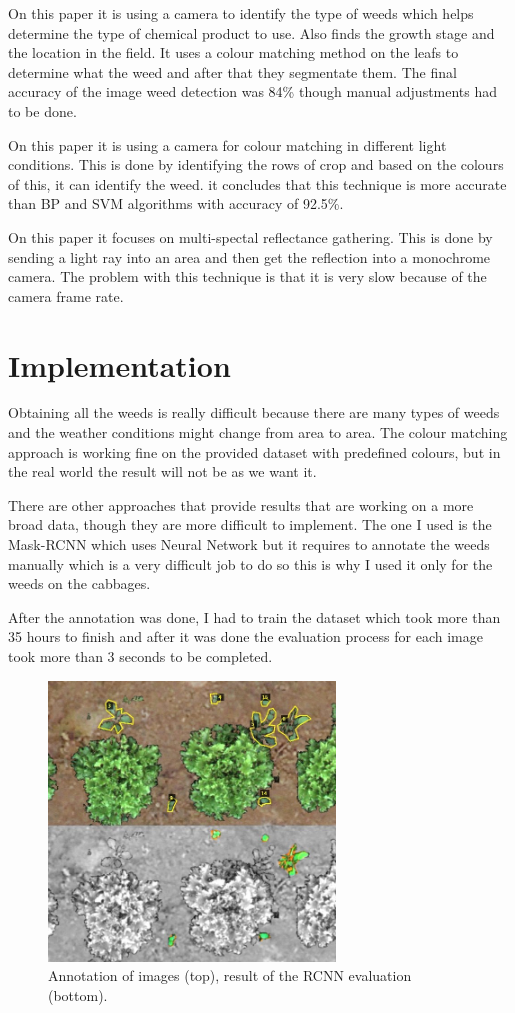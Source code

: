 \documentclass[journal]{IEEEtran}
\begin{document}
On this paper \cite{weed_control4} it is using a camera to identify the type of weeds which helps determine the type of chemical product to use. Also finds the growth stage and the location in the field. It uses a colour matching method on the leafs to determine what the weed and after that they segmentate them. The final accuracy of the image weed detection was 84\% though manual adjustments had to be done.

On this paper \cite{weed_control5} it is using a camera for colour matching in different light conditions. This is done by identifying the rows of crop and based on the colours of this, it can identify the weed. it concludes that this technique is more accurate than BP and SVM algorithms with accuracy of 92.5\%.

On this paper \cite{weed_control5} it focuses on multi-spectal reflectance gathering. This is done by sending a light ray into an area and then get the reflection into a monochrome camera. The problem with this technique is that it is very slow because of the camera frame rate.

\newpage
\section{Implementation}
Obtaining all the weeds is really difficult because there are many types of weeds and the weather conditions might change from area to area. The colour matching approach is working fine on the provided dataset with predefined colours, but in the real world the result will not be as we want it. 

There are other approaches that provide results that are working on a more broad data, though they are more difficult to implement. The one I used is the Mask-RCNN which uses Neural Network but it requires to annotate the weeds manually which is a very difficult job to do so this is why I used it only for the weeds on the cabbages.

After the annotation was done, I had to train the dataset which took more than 35 hours to finish and after it was done the evaluation process for each image took more than 3 seconds to be completed.

\begin{figure}[ht]
\includegraphics[width=3in]{cnn}
\caption{Annotation of images (top), result of the RCNN evaluation (bottom).}
\label{annotation_cnn}
\end{figure}
\end{document}
